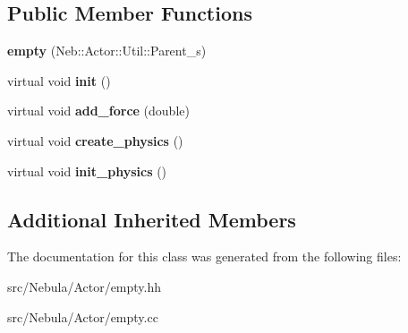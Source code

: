 \subsection*{Public Member Functions}
\begin{DoxyCompactItemize}
\item 
\hypertarget{classNeb_1_1Actor_1_1empty_a1388e7d1394749a2b6e6598ef69cb7bf}{{\bfseries empty} (Neb\-::\-Actor\-::\-Util\-::\-Parent\-\_\-s)}\label{classNeb_1_1Actor_1_1empty_a1388e7d1394749a2b6e6598ef69cb7bf}

\item 
\hypertarget{classNeb_1_1Actor_1_1empty_a6309e078d4d8a45b9316d55b387111d7}{virtual void {\bfseries init} ()}\label{classNeb_1_1Actor_1_1empty_a6309e078d4d8a45b9316d55b387111d7}

\item 
\hypertarget{classNeb_1_1Actor_1_1empty_ae38621f3ae057ad375ca92af3711a98c}{virtual void {\bfseries add\-\_\-force} (double)}\label{classNeb_1_1Actor_1_1empty_ae38621f3ae057ad375ca92af3711a98c}

\item 
\hypertarget{classNeb_1_1Actor_1_1empty_a76ce00f25471d85dd2469a458491ecfd}{virtual void {\bfseries create\-\_\-physics} ()}\label{classNeb_1_1Actor_1_1empty_a76ce00f25471d85dd2469a458491ecfd}

\item 
\hypertarget{classNeb_1_1Actor_1_1empty_a55c552dcd2d7876b36cf54583ea4be3d}{virtual void {\bfseries init\-\_\-physics} ()}\label{classNeb_1_1Actor_1_1empty_a55c552dcd2d7876b36cf54583ea4be3d}

\end{DoxyCompactItemize}
\subsection*{Additional Inherited Members}


The documentation for this class was generated from the following files\-:\begin{DoxyCompactItemize}
\item 
src/\-Nebula/\-Actor/empty.\-hh\item 
src/\-Nebula/\-Actor/empty.\-cc\end{DoxyCompactItemize}
